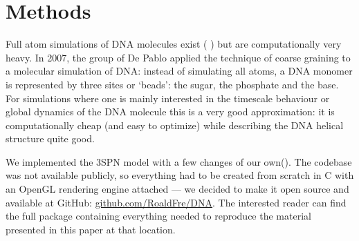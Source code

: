 \section{Methods}

Full atom simulations of DNA molecules exist ( ) but are computationally very heavy. In 2007, the group of De Pablo \cite{knotts2007coarse} applied the technique of coarse graining to a molecular simulation of DNA: instead of simulating all atoms, a DNA monomer is represented by three sites or `beads': the sugar, the phosphate and the base. For simulations where one is mainly interested in the timescale behaviour or global dynamics of the DNA molecule this is a very good approximation: it is computationally cheap (and easy to optimize) while describing the DNA helical structure quite good. 

We implemented the 3SPN model with a few changes of our own(). The codebase was not available publicly, so everything had to be created from scratch in C with an OpenGL rendering engine attached --- we decided to make it open source and available at GitHub: \href{https://github.com/RoaldFre/DNA}{github.com/RoaldFre/DNA}. The interested reader can find the full package containing everything needed to reproduce the material presented in this paper at that location.












